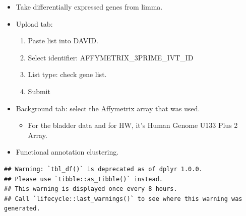 \documentclass[
]{article}
\newenvironment{Shaded}{\begin{snugshade}}{\end{snugshade}}
\newcommand{\DataTypeTok}[1]{\textcolor[rgb]{0.13,0.29,0.53}{#1}}
\newcommand{\KeywordTok}[1]{\textcolor[rgb]{0.13,0.29,0.53}{\textbf{#1}}}
\newcommand{\NormalTok}[1]{#1}
\newcommand{\OperatorTok}[1]{\textcolor[rgb]{0.81,0.36,0.00}{\textbf{#1}}}
\newcommand{\StringTok}[1]{\textcolor[rgb]{0.31,0.60,0.02}{#1}}
\providecommand{\tightlist}{%
  \setlength{\itemsep}{0pt}\setlength{\parskip}{0pt}}
\begin{document}
\begin{itemize}
\tightlist
\item
  Take differentially expressed genes from limma.
\item
  Upload tab:

  \begin{enumerate}
  \def\labelenumi{\arabic{enumi}.}
  \tightlist
  \item
    Paste list into DAVID.
  \item
    Select identifier: AFFYMETRIX\_3PRIME\_IVT\_ID
  \item
    List type: check gene list.
  \item
    Submit
  \end{enumerate}
\item
  Background tab: select the Affymetrix array that was used.

  \begin{itemize}
  \tightlist
  \item
    For the bladder data and for HW, it's Human Genome U133 Plus 2
    Array.
  \end{itemize}
\item
  Functional annotation clustering.
\end{itemize}

\begin{Shaded}
\end{Shaded}

\begin{verbatim}
## Warning: `tbl_df()` is deprecated as of dplyr 1.0.0.
## Please use `tibble::as_tibble()` instead.
## This warning is displayed once every 8 hours.
## Call `lifecycle::last_warnings()` to see where this warning was generated.
\end{verbatim}
\end{document}
